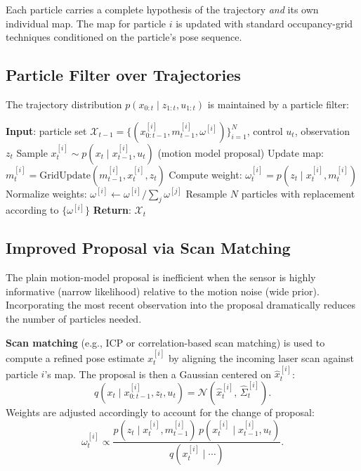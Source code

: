\documentclass[11pt,a4paper]{article}
\theoremstyle{definition}
\theoremstyle{plain}
\theoremstyle{remark}
\begin{document}
Each particle carries a complete hypothesis of the trajectory \emph{and} its own individual map. The map for particle $i$ is updated with standard occupancy-grid techniques conditioned on the particle's pose sequence.

\subsection{Particle Filter over Trajectories}

The trajectory distribution $p(x_{0:t} \mid z_{1:t}, u_{1:t})$ is maintained by a particle filter:

\begin{algorithm}
\caption{Rao-Blackwellized SLAM Particle Filter (one step)}
\begin{algorithmic}
\STATE \textbf{Input}: particle set $\mathcal{X}_{t-1} = \{(x_{0:t-1}^{[i]}, m_{t-1}^{[i]}, \omega^{[i]})\}_{i=1}^{N}$, control $u_t$, observation $z_t$ %
    \STATE Sample $x_t^{[i]} \sim p(x_t \mid x_{t-1}^{[i]}, u_t)$ \hfill (motion model proposal)
    \STATE Update map: $m_t^{[i]} = \text{GridUpdate}(m_{t-1}^{[i]}, x_t^{[i]}, z_t)$
    \STATE Compute weight: $\omega_t^{[i]} = p(z_t \mid x_t^{[i]}, m_t^{[i]})$
\ENDFOR
\STATE Normalize weights: $\omega^{[i]} \leftarrow \omega^{[i]} / \sum_j \omega^{[j]}$
\STATE Resample $N$ particles with replacement according to $\{\omega^{[i]}\}$
\STATE \textbf{Return}: $\mathcal{X}_t$
\end{algorithmic}
\end{algorithm}

\subsection{Improved Proposal via Scan Matching}

The plain motion-model proposal is inefficient when the sensor is highly informative (narrow likelihood) relative to the motion noise (wide prior). Incorporating the most recent observation into the proposal dramatically reduces the number of particles needed.

\textbf{Scan matching} (e.g., ICP or correlation-based scan matching) is used to compute a refined pose estimate $\hat{x}_t^{[i]}$ by aligning the incoming laser scan against particle $i$'s map. The proposal is then a Gaussian centered on $\hat{x}_t^{[i]}$:
\[
    q(x_t \mid x_{0:t-1}^{[i]}, z_t, u_t) = \mathcal{N}(\hat{x}_t^{[i]},\, \hat{\Sigma}_t^{[i]}).
\]
Weights are adjusted accordingly to account for the change of proposal:
\[
    \omega_t^{[i]} \propto \frac{p(z_t \mid x_t^{[i]}, m_{t-1}^{[i]})\, p(x_t^{[i]} \mid x_{t-1}^{[i]}, u_t)}{q(x_t^{[i]} \mid \cdots)}.
\]
\end{document}
